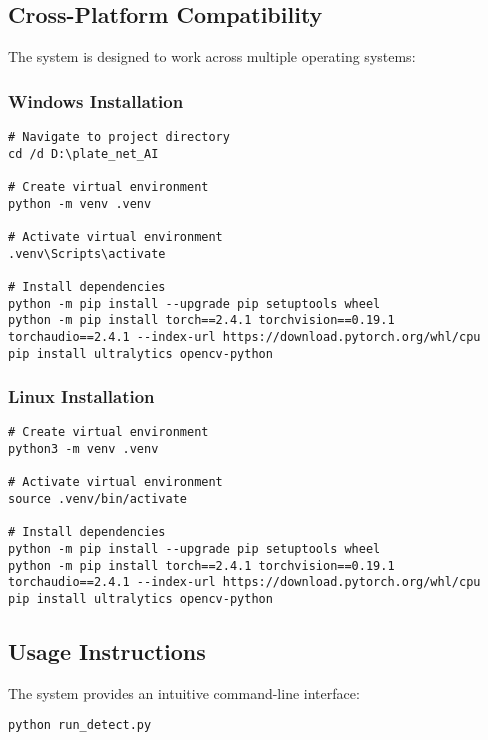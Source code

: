 \documentclass[12pt,a4paper]{article}
\begin{document}
\subsection{Cross-Platform Compatibility}

The system is designed to work across multiple operating systems:

\subsubsection{Windows Installation}

\begin{lstlisting}[caption=Windows Setup Commands]
# Navigate to project directory
cd /d D:\plate_net_AI

# Create virtual environment
python -m venv .venv

# Activate virtual environment
.venv\Scripts\activate

# Install dependencies
python -m pip install --upgrade pip setuptools wheel
python -m pip install torch==2.4.1 torchvision==0.19.1 torchaudio==2.4.1 --index-url https://download.pytorch.org/whl/cpu
pip install ultralytics opencv-python
\end{lstlisting}

\subsubsection{Linux Installation}

\begin{lstlisting}[caption=Linux Setup Commands]
# Create virtual environment
python3 -m venv .venv

# Activate virtual environment
source .venv/bin/activate

# Install dependencies
python -m pip install --upgrade pip setuptools wheel
python -m pip install torch==2.4.1 torchvision==0.19.1 torchaudio==2.4.1 --index-url https://download.pytorch.org/whl/cpu
pip install ultralytics opencv-python
\end{lstlisting}

\subsection{Usage Instructions}

The system provides an intuitive command-line interface:

\begin{lstlisting}[caption=Running the Detection System]
python run_detect.py
\end{lstlisting}
\end{document}
